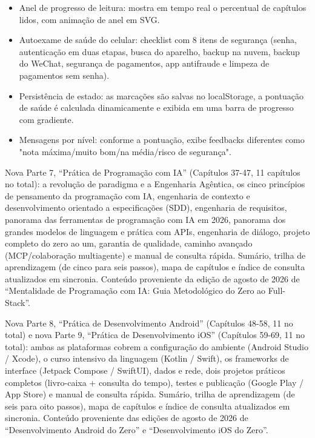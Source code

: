 \begin{itemize}
  \item Anel de progresso de leitura: mostra em tempo real o percentual de capítulos lidos, com animação de anel em SVG.
  \item Autoexame de saúde do celular: checklist com 8 itens de segurança (senha, autenticação em duas etapas, busca do aparelho, backup na nuvem, backup do WeChat, segurança de pagamentos, app antifraude e limpeza de pagamentos sem senha).
  \item Persistência de estado: as marcações são salvas no localStorage, a pontuação de saúde é calculada dinamicamente e exibida em uma barra de progresso com gradiente.
  \item Mensagens por nível: conforme a pontuação, exibe feedbacks diferentes como "nota máxima/muito bom/na média/risco de segurança".
\end{itemize}


Nova Parte 7, “Prática de Programação com IA” (Capítulos 37-47, 11 capítulos no total): a revolução de paradigma e a Engenharia Agêntica, os cinco princípios de pensamento da programação com IA, engenharia de contexto e desenvolvimento orientado a especificações (SDD), engenharia de requisitos, panorama das ferramentas de programação com IA em 2026, panorama dos grandes modelos de linguagem e prática com APIs, engenharia de diálogo, projeto completo do zero ao um, garantia de qualidade, caminho avançado (MCP/colaboração multiagente) e manual de consulta rápida. Sumário, trilha de aprendizagem (de cinco para seis passos), mapa de capítulos e índice de consulta atualizados em sincronia. Conteúdo proveniente da edição de agosto de 2026 de “Mentalidade de Programação com IA: Guia Metodológico do Zero ao Full-Stack”.

Nova Parte 8, “Prática de Desenvolvimento Android” (Capítulos 48-58, 11 no total) e nova Parte 9, “Prática de Desenvolvimento iOS” (Capítulos 59-69, 11 no total): ambas as plataformas cobrem a configuração do ambiente (Android Studio / Xcode), o curso intensivo da linguagem (Kotlin / Swift), os frameworks de interface (Jetpack Compose / SwiftUI), dados e rede, dois projetos práticos completos (livro-caixa + consulta do tempo), testes e publicação (Google Play / App Store) e manual de consulta rápida. Sumário, trilha de aprendizagem (de seis para oito passos), mapa de capítulos e índice de consulta atualizados em sincronia. Conteúdo proveniente das edições de agosto de 2026 de “Desenvolvimento Android do Zero” e “Desenvolvimento iOS do Zero”.

